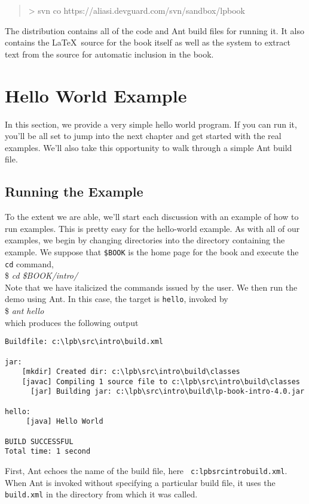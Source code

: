 \begin{quote}
{\small\ttfamily
> svn co https://aliasi.devguard.com/svn/sandbox/lpbook
}
\end{quote}
%
The distribution contains all of the code and Ant build files for
running it.  It also contains the \LaTeX\ source for the book itself
as well as the system to extract text from the source for automatic
inclusion in the book.


\section{Hello World Example}

In this section, we provide a very simple hello world program.  If you
can run it, you'll be all set to jump into the next chapter and get
started with the real examples.  We'll also take this opportunity to
walk through a simple Ant build file.

\subsection{Running the Example}

To the extent we are able, we'll start each discussion with an example
of how to run examples.  This is pretty easy for the hello-world
example.  As with all of our examples, we begin by changing
directories into the directory containing the example.  We suppose
that {\small\tt \$BOOK} is the home page for the book and execute the
{\small\tt cd} command,
\\[8pt]
{\small \$ \it\ttfamily cd \$BOOK/intro/}
\\[8pt]
Note that we have italicized the commands issued by the user.
%
We then run the demo using Ant.  In this case, the target is {\small\tt hello},
invoked by
\\[8pt]
{\ttfamily \$ \it\ttfamily ant hello}
\\[8pt]
which produces the following output
%
{\small\begin{verbatim}
Buildfile: c:\lpb\src\intro\build.xml

jar:
    [mkdir] Created dir: c:\lpb\src\intro\build\classes
    [javac] Compiling 1 source file to c:\lpb\src\intro\build\classes
      [jar] Building jar: c:\lpb\src\intro\build\lp-book-intro-4.0.jar

hello:
     [java] Hello World

BUILD SUCCESSFUL
Total time: 1 second
\end{verbatim}}
%
First, Ant echoes the name of the build file, here {\tt
c:{\bk}lpb{\bk}src{\bk}intro{\bk}build.xml}.  When Ant is
invoked without specifying a particular build file, it uses the
{\tt build.xml} in the directory from which it was called.  

